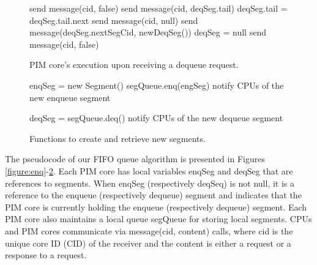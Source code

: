 \documentclass[11pt]{article}
\begin{document}
\begin{figure}
\begin{algorithm}[H]
\Begin
{
    {
        send message(cid, false)\;
    }
    {
        {
			send message(cid, deqSeg.tail)\;
            deqSeg.tail = deqSeg.tail.next\;   
        }
        {
			{
				send message(cid, null)\;
			}
            {
                send message(deqSeg.nextSegCid, newDeqSeg())\;
                deqSeg = null\;
                send message(cid, false)\;
            }            
        }
    }
}
\end{algorithm}
\caption{PIM core's execution upon receiving a dequeue request.}
\label{figure:deq}
\end{figure}

\begin{figure}
\begin{algorithm}[H]
\Begin
{
    enqSeg = new Segment() \;
    segQueue.enq(engSeg) \;
    notify CPUs of the new enqueue segment\;
}
\end{algorithm}

\begin{algorithm}[H]
\Begin
{
    deqSeg = segQueue.deq() \;
    notify CPUs of the new dequeue segment\;
}
\end{algorithm}	
\caption{Functions to create and retrieve new segments.}
\label{figure:newSegment}
\end{figure}

The pseudocode of our FIFO queue algorithm is presented in 
Figures \ref{figure:enq}-\ref{figure:newSegment}. 
Each PIM core has local variables enqSeg and deqSeg that are references to segments.
When enqSeg (respectively deqSeq) is not null, it is a reference to the enqueue 
(respectively dequeue) segment and indicates that the PIM core is currently holding 
the enqueue (respectively dequeue) segment.
Each PIM core also maintains a local queue segQueue for storing local segments.
CPUs and PIM cores communicate via message(cid, content) calls, where cid is the unique core ID (CID) 
of the receiver and the content is either a request or a response to a request.
\end{document}

